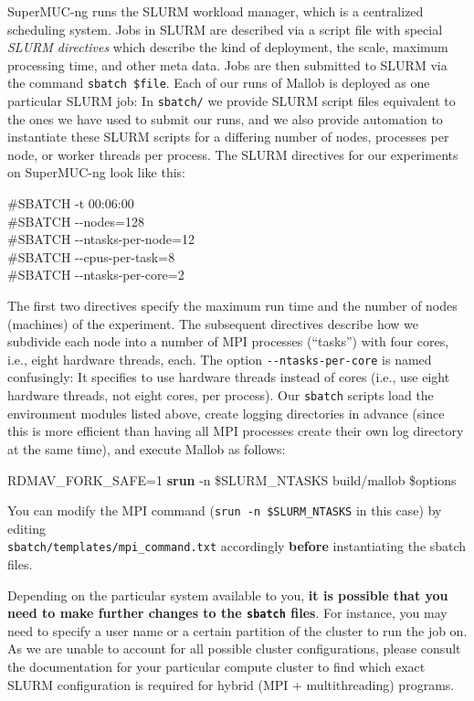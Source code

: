 \documentclass[runningheads]{article}
\numberwithin{dummy}{subsection}
\begin{document}
SuperMUC-ng runs the SLURM workload manager, which is a centralized scheduling system.
Jobs in SLURM are described via a script file with special \textit{SLURM directives} which describe the kind of deployment, the scale, maximum processing time, and other meta data.
Jobs are then submitted to SLURM via the command \texttt{sbatch \$file}.
Each of our runs of Mallob is deployed as one particular SLURM job: In \texttt{sbatch/} we provide SLURM script files equivalent to the ones we have used to submit our runs, and we also provide automation to instantiate these SLURM scripts for a differing number of nodes, processes per node, or worker threads per process.
The SLURM directives for our experiments on SuperMUC-ng look like this:
\begin{ttfenv}
\#SBATCH -t 00:06:00\\
\#SBATCH -{}-nodes=128\\
\#SBATCH -{}-ntasks-per-node=12\\
\#SBATCH -{}-cpus-per-task=8\\
\#SBATCH -{}-ntasks-per-core=2
\end{ttfenv}
The first two directives specify the maximum run time and the number of nodes (machines) of the experiment.
The subsequent directives describe how we subdivide each node into a number of MPI processes (``tasks'') with four cores, i.e., eight hardware threads, each.
The option \texttt{-{}-ntasks-per-core} is named confusingly: It specifies to use hardware threads instead of cores (i.e., use eight hardware threads, not eight cores, per process).
Our \texttt{sbatch} scripts load the environment modules listed above, create logging directories in advance (since this is more efficient than having all MPI processes create their own log directory at the same time), and execute Mallob as follows:
\begin{ttfenv}
RDMAV\_FORK\_SAFE=1 \textbf{srun} -n \$SLURM\_NTASKS build/mallob \$options
\end{ttfenv}
You can modify the MPI command (\texttt{srun -n \$SLURM\_NTASKS} in this case) by editing\\
\texttt{sbatch/templates/mpi\_command.txt} accordingly \textbf{before} instantiating the sbatch files.

Depending on the particular system available to you, \textbf{it is possible that you need to make further changes to the \texttt{sbatch} files}.
For instance, you may need to specify a user name or a certain partition of the cluster to run the job on.
As we are unable to account for all possible cluster configurations, please consult the documentation for your particular compute cluster to find which exact SLURM configuration is required for hybrid (MPI + multithreading) programs.
\end{document}

